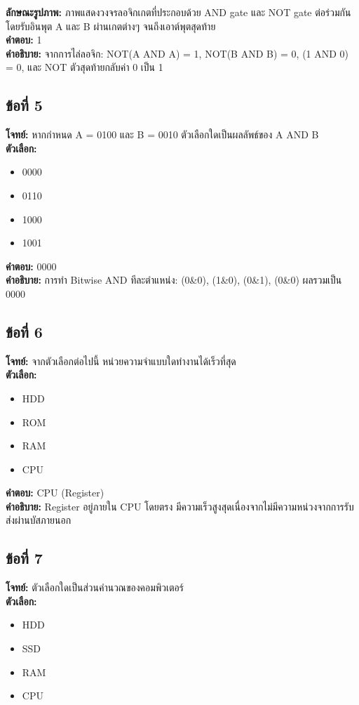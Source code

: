 \documentclass[12pt]{article}
\begin{document}
\textbf{ลักษณะรูปภาพ:} ภาพแสดงวงจรลอจิกเกตที่ประกอบด้วย AND gate และ NOT gate ต่อร่วมกัน โดยรับอินพุต A และ B ผ่านเกตต่างๆ จนถึงเอาต์พุตสุดท้าย\\
\textbf{คำตอบ:} 1\\
\textbf{คำอธิบาย:} จากการไล่ลอจิก: NOT(A AND A) = 1, NOT(B AND B) = 0, (1 AND 0) = 0, และ NOT ตัวสุดท้ายกลับค่า 0 เป็น 1

\subsection*{ข้อที่ 5}
\textbf{โจทย์:} หากกำหนด A = 0100 และ B = 0010 ตัวเลือกใดเป็นผลลัพธ์ของ A AND B\\
\textbf{ตัวเลือก:}
\begin{itemize}
    \item 0000
    \item 0110
    \item 1000
    \item 1001
\end{itemize}

\textbf{คำตอบ:} 0000\\
\textbf{คำอธิบาย:} การทำ Bitwise AND ทีละตำแหน่ง: (0\&0), (1\&0), (0\&1), (0\&0) ผลรวมเป็น 0000

\subsection*{ข้อที่ 6}
\textbf{โจทย์:} จากตัวเลือกต่อไปนี้ หน่วยความจำแบบใดทำงานได้เร็วที่สุด\\
\textbf{ตัวเลือก:}
\begin{itemize}
    \item HDD
    \item ROM
    \item RAM
    \item CPU
\end{itemize}

\textbf{คำตอบ:} CPU (Register)\\
\textbf{คำอธิบาย:} Register อยู่ภายใน CPU โดยตรง มีความเร็วสูงสุดเนื่องจากไม่มีความหน่วงจากการรับส่งผ่านบัสภายนอก

\subsection*{ข้อที่ 7}
\textbf{โจทย์:} ตัวเลือกใดเป็นส่วนคำนวณของคอมพิวเตอร์\\
\textbf{ตัวเลือก:}
\begin{itemize}
    \item HDD
    \item SSD
    \item RAM
    \item CPU
\end{itemize}
\end{document}
